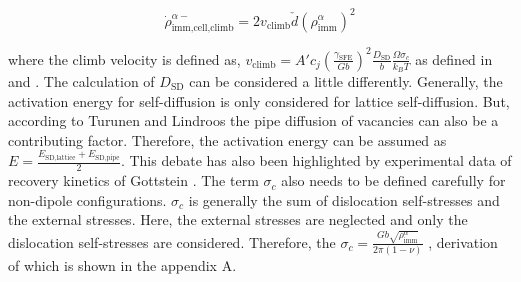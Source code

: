\documentclass[a4paper,11pt]{article}
\begin{document}
\begin{equation}
\dot\rho_{\text{imm,cell,climb}}^{\alpha-} = 2 v_\text{climb} \check{d} {\left(\rho_{\text{imm}}^{\alpha}\right)}^2 \label{eq:15}
\end{equation}

%
where the climb velocity is defined as, 
\begin{math} v_\text{climb} = A' c_j {\left( \frac{\gamma_\text{SFE}}{Gb} \right)}^{2} \frac{D_\text{SD}}{b} \frac{\Omega \sigma_c }{k_B T}\end{math}
as defined in \cite{Eisenlohr2004} and \cite{Argon1981}. 
The calculation of \begin{math} D_{\text{SD}} \end{math} can be considered a little differently. 
Generally, the activation energy for self-diffusion is only considered for lattice self-diffusion. 
But, according to Turunen and Lindroos \cite{Turunen1974} the pipe diffusion of vacancies can also be a contributing factor. 
Therefore, the activation energy can be assumed as \begin{math} E = \frac{E_{\text{SD,lattice}} + E_{\text{SD,pipe}}}{2} \end{math}.
This debate has also been highlighted by experimental data of recovery kinetics of Gottstein \cite{Lu2011} . 
The term \begin{math} \sigma_c \end{math} also needs to be defined carefully for non-dipole configurations. 
\begin{math} \sigma_c \end{math} is generally the sum of dislocation self-stresses and the external stresses. 
Here, the external stresses are neglected and only the dislocation self-stresses are considered. 
Therefore, the \begin{math} \sigma_c = \frac{Gb \sqrt{\rho_{\text{imm}}^\alpha}}{2 \pi \left( 1 - \nu \right)} \end{math} , derivation of which is shown in the appendix A. 
% 
\end{document}
